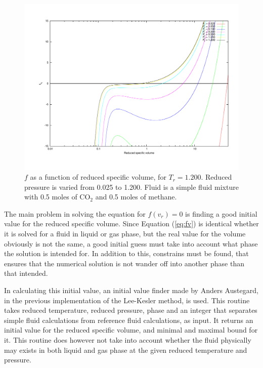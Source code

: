 \documentclass[english]{../thermomemo/thermomemo}
\numberwithin{equation}{section}
\newcommand*{\reff}[1]{(\ref{#1})}
\begin{document}
\begin{figure}[h]
  \centering
  \includegraphics[trim = 1.5cm 2cm 0 1cm, clip = true, width=14cm]{12Tc_3}
  \caption{$f$ as a function of reduced specific volume, for $T_r = 1.200$. Reduced pressure is varied from 0.025 to 1.200. Fluid is a simple fluid mixture with 0.5 moles of CO$_2$ and 0.5 moles of methane.}
  \label{fig:1.2Tc}
\end{figure}

The main problem in solving the equation for $f(v_r) = 0$ is finding a good initial value for the reduced specific volume. Since Equation \reff{eq:fv} is identical whether it is solved for a fluid in liquid or gas phase, but the real value for the volume obviously is not the same, a good initial guess must take into account what phase the solution is intended for. In addition to this, constrains must be found, that ensures that the numerical solution is not wander off into another phase than that intended. 

In calculating this initial value, an initial value finder made by Anders Austegard, in the previous implementation of the Lee-Kesler method, is used. This routine takes reduced temperature, reduced pressure, phase and an integer that separates simple fluid calculations from reference fluid calculations, as input. It returns an initial value for the reduced specific volume, and minimal and maximal bound for it. This routine does however not take into account whether the fluid physically may exists in both liquid and gas phase at the given reduced temperature and pressure.
\end{document}
